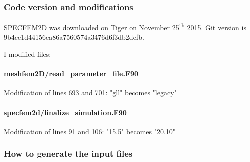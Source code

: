 \documentclass{article}
\begin{document}
\subsubsection{Code version and modifications}

SPECFEM2D was downloaded on Tiger on November 25\textsuperscript{th} 2015. Git version is 9b4ce1d44156ea86a7560574a3476d6f3db2defb.

I modified files:

\paragraph{meshfem2D/read\_parameter\_file.F90} Modification of lines 693 and 701: "gll" becomes "legacy"

\paragraph{specfem2d/finalize\_simulation.F90} Modification of lines 91 and 106: "15.5" becomes "20.10"

\subsubsection{How to generate the input files}
\end{document}

